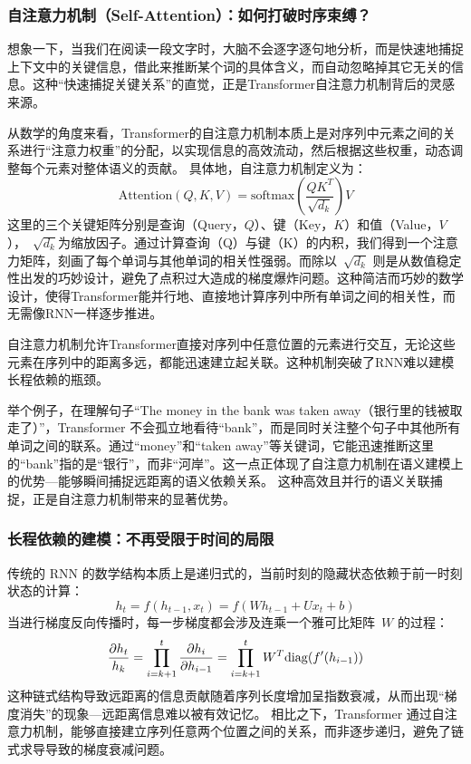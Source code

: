   \subsubsection*{  自注意力机制（Self-Attention）：如何打破时序束缚？}
想象一下，当我们在阅读一段文字时，大脑不会逐字逐句地分析，而是快速地捕捉上下文中的关键信息，借此来推断某个词的具体含义，而自动忽略掉其它无关的信息。这种“快速捕捉关键关系”的直觉，正是Transformer自注意力机制背后的灵感来源。
 
 从数学的角度来看，Transformer的自注意力机制本质上是对序列中元素之间的关系进行“注意力权重”的分配，以实现信息的高效流动，然后根据这些权重，动态调整每个元素对整体语义的贡献。
 具体地，自注意力机制定义为：
   \[
  \text{Attention}(Q, K, V) = \text{softmax} \left( \frac{QK^T}{\sqrt{d_k}} \right) V
  \]
  这里的三个关键矩阵分别是查询（Query，$Q$）、键（Key，$K$）和值（Value，$V$），~$\sqrt{d_k}$为缩放因子。通过计算查询（Q）与键（K）的内积，我们得到一个注意力矩阵，刻画了每个单词与其他单词的相关性强弱。而除以~$\sqrt{d_k}$ 则是从数值稳定性出发的巧妙设计，避免了点积过大造成的梯度爆炸问题。这种简洁而巧妙的数学设计，使得Transformer能并行地、直接地计算序列中所有单词之间的相关性，而无需像RNN一样逐步推进。

自注意力机制允许Transformer直接对序列中任意位置的元素进行交互，无论这些元素在序列中的距离多远，都能迅速建立起关联。这种机制突破了RNN难以建模长程依赖的瓶颈。

举个例子，在理解句子“The money in the bank was taken away（银行里的钱被取走了）”，Transformer 不会孤立地看待“bank”，而是同时关注整个句子中其他所有单词之间的联系。通过“money”和“taken away”等关键词，它能迅速推断这里的“bank”指的是“银行”，而非“河岸”。这一点正体现了自注意力机制在语义建模上的优势---能够瞬间捕捉远距离的语义依赖关系。
这种高效且并行的语义关联捕捉，正是自注意力机制带来的显著优势。

  \subsubsection*{ 长程依赖的建模：不再受限于时间的局限 }
 传统的 RNN 的数学结构本质上是递归式的，当前时刻的隐藏状态依赖于前一时刻状态的计算：
  $$ 
 h_t = f\left ( h_{t-1} , x_t \right)=  f\left ( Wh_{t-1} +U x_t +b \right)
 $$
 当进行梯度反向传播时，每一步梯度都会涉及连乘一个雅可比矩阵~$W$ 的过程：
 $$
\frac{ \partial h_t }{h_k}= \prod_{i=k+1}^t \frac{\partial h_i}{\partial h_{i-1}} =\prod_{i=k+1}^t W^T {\rm diag}( f^\prime(h_{i-1}))
 $$
这种链式结构导致远距离的信息贡献随着序列长度增加呈指数衰减，从而出现“梯度消失”的现象---远距离信息难以被有效记忆。
相比之下，Transformer 通过自注意力机制，能够直接建立序列任意两个位置之间的关系，而非逐步递归，避免了链式求导导致的梯度衰减问题。

